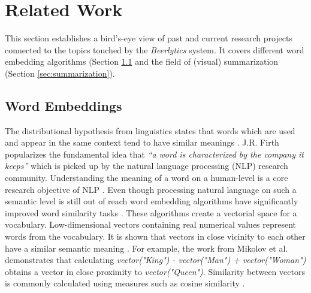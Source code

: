 \section{Related Work} \label{sec:related-work}
This section establishes a bird's-eye view of past and current research projects connected to the topics touched by the \textit{Beerlytics} system.
It covers different word embedding algorithms (Section \ref{sec:word-embeddings} and the field of (visual) summarization (Section \ref{sec:summarization}).


\subsection{Word Embeddings} \label{sec:word-embeddings}
The distributional hypothesis from linguistics states that words which are used and appear in the same context tend to have similar meanings \cite{Harris2015}.
J.R. Firth popularizes the fundamental idea that \emph{``a word is characterized by the company it keeps''} \cite{Firth1957} which is picked up by the natural language processing (NLP) research community.
Understanding the meaning of a word on a human-level is a core research objective of NLP \cite{Levy2015}.
Even though processing natural language on such a semantic level is still out of reach word embedding algorithms have significantly improved word similarity tasks \cite{Young}.
These algorithms create a vectorial space for a vocabulary.
Low-dimensional vectors containing real numerical values represent words from the vocabulary.
It is shown that vectors in close vicinity to each other have a similar semantic meaning \cite{Levy2015}.
For example, the work from Mikolov et al. \cite{Mikolov2013a} demonstrates that calculating \emph{vector("King") - vector("Man") + vector("Woman")} obtains a vector in close proximity to \emph{vector("Queen")}.
Similarity between vectors is commonly calculated using measures such as cosine similarity \cite{Young}.

